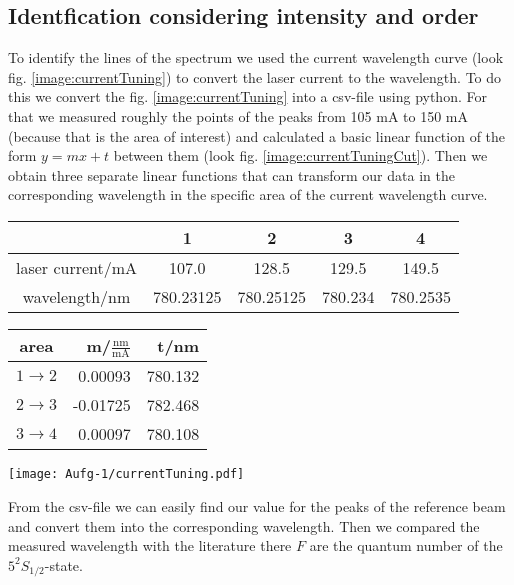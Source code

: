 \subsection*{Identfication considering intensity and order}
To identify the lines of the spectrum we used the current wavelength curve (look fig. \ref{image:currentTuning}) to convert the laser current to the wavelength. To do this we convert the fig. \ref{image:currentTuning} into a csv-file using python. For that we measured roughly the points of the peaks from 105 mA to 150 mA (because that is the area of interest) and calculated a basic linear function of the form $y=mx +t$ between them (look fig. \ref{image:currentTuningCut}). Then we obtain three separate linear functions that can transform our data in the corresponding wavelength in the specific area of the current wavelength curve.
\begin{center}
    \begin{tabular}{c | c c c c}
        {} & 1 & 2 & 3 & 4 \\
        \hline
        laser current/mA & 107.0 & 128.5 & 129.5 & 149.5\\
        wavelength/nm & 780.23125 & 780.25125 & 780.234 & 780.2535\\
    \end{tabular}
    \begin{tabular}{c | r r }
        area & m/$\frac{\text{nm}}{\text{mA}}$ & t/nm\\
        \hline
        $1 \rightarrow 2$ & 0.00093  & 780.132 \\
        $2 \rightarrow 3$ & -0.01725 & 782.468 \\
        $3 \rightarrow 4$ & 0.00097  & 780.108 \\
    \end{tabular}
\end{center}
\begin{center}
    \texttt{[image: Aufg-1/currentTuning.pdf]}
    \label{image:currentTuningCut}
\end{center}
From the csv-file we can easily find our value for the peaks of the reference beam and convert them into the corresponding wavelength. Then we compared the measured wavelength with the literature there $F$ are the quantum number of the $5^2S_{1/2}$-state.
